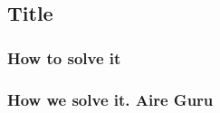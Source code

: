\subsection{Title}
 

\subsubsection{How to solve it} 


\subsubsection{How we solve it. Aire Guru} 
 
\begin{itemize}
    \done
    \crossed
    
\end{itemize}
\newpage